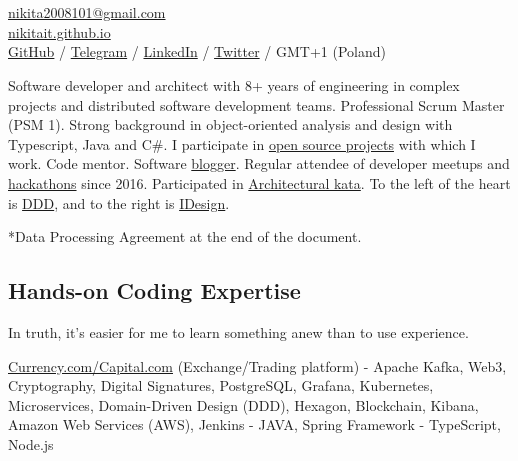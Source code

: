 \documentclass{yb}
\begin{document}
\ybPrintPhoto{}

\section*{\Large {}}

\href{mailto:nikita2008101@gmail.com}{nikita2008101@gmail.com}\\%
\href{https://nikitait.github.io/}{nikitait.github.io}\\%
\href{https://github.com/nikitait}{GitHub} /
\href{https://t.me/NonNikita}{Telegram} /
\href{https://www.linkedin.com/in/nikita-fedorov-041243126}{LinkedIn} /
\href{https://twitter.com/intent/follow?screen_name=Nikita_Fiodorov}{Twitter} / GMT+1 (Poland)
\vspace*{12pt}

Software developer and architect with
8+ years of engineering in complex projects and distributed software
development teams. Professional Scrum Master (PSM 1). Strong background in object-oriented analysis and design
with Typescript, Java and C\#. I participate in \href{https://github.com/nikitait}{open source projects} with which I work. Code mentor. Software
\href{https://nikitait.github.io}{blogger}. Regular attendee of developer meetups and \href{https://www.youtube.com/watch?v=gVKDU043EWI&t=1s&ab_channel=EPAMSaint-Petersburg}{hackathons} since 2016. Participated in \href{
https://www.youtube.com/watch?v=Qu3g_eiY4XA&ab_channel=%
}{Architectural kata}. To the left of the heart is \href{https://github.com/ddd-crew}{DDD}, and to the right is \href{https://www.idesign.net/}{IDesign}.

*Data Processing Agreement at the end of the document.

\subsection*{Hands-on Coding Expertise}

In truth, it's easier for me to learn something anew than to use experience.



\href{https://currency.com/}{Currency.com/Capital.com} (Exchange/Trading platform)
\newline - Apache Kafka, Web3, Cryptography, Digital Signatures, PostgreSQL, Grafana, Kubernetes, Microservices, Domain-Driven Design (DDD), Hexagon, Blockchain, Kibana, Amazon Web Services (AWS), Jenkins
\newline - JAVA, Spring Framework
\newline - TypeScript, Node.js
\end{document}
